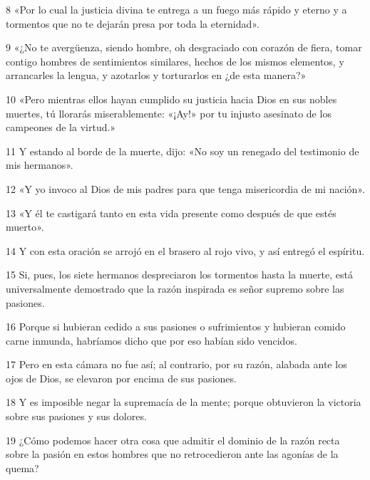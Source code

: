 \par 8 «Por lo cual la justicia divina te entrega a un fuego más rápido y eterno y a tormentos que no te dejarán presa por toda la eternidad».

\par 9 «¿No te avergüenza, siendo hombre, oh desgraciado con corazón de fiera, tomar contigo hombres de sentimientos similares, hechos de los mismos elementos, y arrancarles la lengua, y azotarlos y torturarlos en ¿de esta manera?»

\par 10 «Pero mientras ellos hayan cumplido su justicia hacia Dios en sus nobles muertes, tú llorarás miserablemente: «¡Ay!» por tu injusto asesinato de los campeones de la virtud.»

\par 11 Y estando al borde de la muerte, dijo: «No soy un renegado del testimonio de mis hermanos».

\par 12 «Y yo invoco al Dios de mis padres para que tenga misericordia de mi nación».

\par 13 «Y él te castigará tanto en esta vida presente como después de que estés muerto».

\par 14 Y con esta oración se arrojó en el brasero al rojo vivo, y así entregó el espíritu.

\par 15 Si, pues, los siete hermanos despreciaron los tormentos hasta la muerte, está universalmente demostrado que la razón inspirada es señor supremo sobre las pasiones.

\par 16 Porque si hubieran cedido a sus pasiones o sufrimientos y hubieran comido carne inmunda, habríamos dicho que por eso habían sido vencidos.

\par 17 Pero en esta cámara no fue así; al contrario, por su razón, alabada ante los ojos de Dios, se elevaron por encima de sus pasiones.

\par 18 Y es imposible negar la supremacía de la mente; porque obtuvieron la victoria sobre sus pasiones y sus dolores.

\par 19 ¿Cómo podemos hacer otra cosa que admitir el dominio de la razón recta sobre la pasión en estos hombres que no retrocedieron ante las agonías de la quema?

